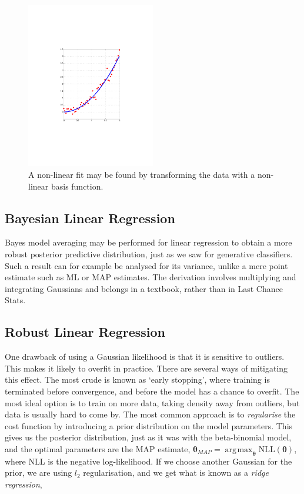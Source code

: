 \documentclass[11pt]{amsart}
\DeclareMathOperator*{\argmax}{\arg\!\max}
\begin{document}
\begin{figure}[!ht]
\centering
\includegraphics[width=0.5\textwidth]{Figures/quadraticfit.pdf}
\caption{A non-linear fit may be found by transforming the data with a non-linear basis function.}
\label{fig:quadraticfit}
\end{figure}

\subsection{Bayesian Linear Regression}

Bayes model averaging may be performed for linear regression to obtain a more robust posterior predictive distribution, just as we saw for generative classifiers. Such a result can for example be analysed for its variance, unlike a mere point estimate such as ML or MAP estimates. The derivation involves multiplying and integrating Gaussians and belongs in a textbook, rather than in Last Chance Stats.

\subsection{Robust Linear Regression}

One drawback of using a Gaussian likelihood is that it is sensitive to outliers. This makes it likely to overfit in practice. There are several ways of mitigating this effect. The most crude is known as `early stopping', where training is terminated before convergence, and before the model has a chance to overfit. The most ideal option is to train on more data, taking density away from outliers, but data is usually hard to come by. The most common approach is to \emph{regularise} the cost function by introducing a prior distribution on the model parameters. This gives us the posterior distribution, just as it was with the beta-binomial model, and the optimal parameters are the MAP estimate, $\boldsymbol\theta_{MAP} = \argmax_{\boldsymbol\theta} \text{NLL}(\boldsymbol\theta)$, where NLL is the negative log-likelihood. If we choose another Gaussian for the prior, we are using $l_2$ regularisation, and we get what is known as a \emph{ridge regression},
\end{document}
